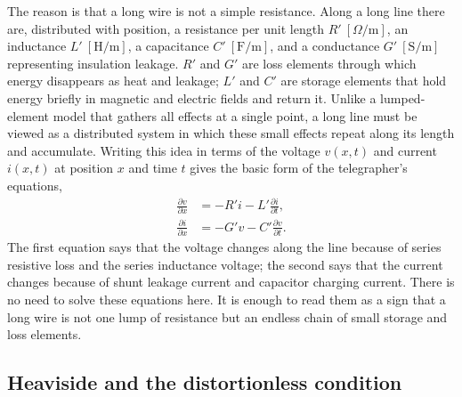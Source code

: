 The reason is that a long wire is not a simple resistance.
Along a long line there are, distributed with position, a resistance per
unit length $R'~[\Omega/\mathrm{m}]$, an inductance $L'~[\mathrm{H/m}]$, a
capacitance $C'~[\mathrm{F/m}]$, and a conductance $G'~[\mathrm{S/m}]$
representing insulation leakage.
$R'$ and $G'$ are loss elements through which energy disappears as heat and
leakage; $L'$ and $C'$ are storage elements that hold energy briefly in
magnetic and electric fields and return it.
Unlike a lumped-element model that gathers all effects at a single point, a
long line must be viewed as a distributed system in which these small
effects repeat along its length and accumulate.
Writing this idea in terms of the voltage $v(x,t)$ and current $i(x,t)$ at
position $x$ and time $t$ gives the basic form of the telegrapher's
equations,
\begin{align}
  \frac{\partial v}{\partial x} &= -R'i - L'\frac{\partial i}{\partial t}, \\
  \frac{\partial i}{\partial x} &= -G'v - C'\frac{\partial v}{\partial t}.
\end{align}
The first equation says that the voltage changes along the line because of
series resistive loss and the series inductance voltage; the second says
that the current changes because of shunt leakage current and capacitor
charging current.
There is no need to solve these equations here.
It is enough to read them as a sign that a long wire is not one lump of
resistance but an endless chain of small storage and loss elements.

\subsection{Heaviside and the distortionless condition}

